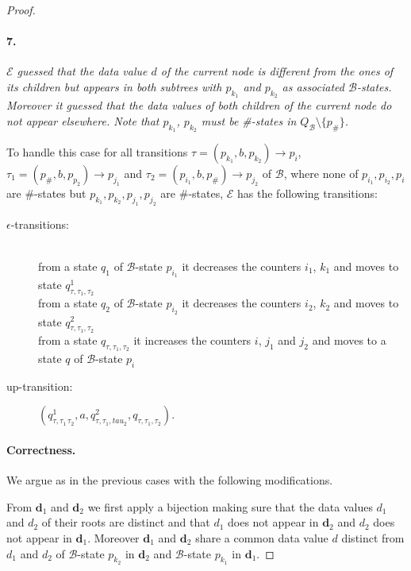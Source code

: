 \documentclass{CSML}
\newcommand\ra{\ensuremath{\rightarrow}}
\newcommand\Ba{\mathcal{B}}
\newcommand\Ea{\mathcal{E}}
\newcommand\dtree{\boldsymbol{d}}
\begin{document}
\begin{proof}
 
\paragraph{\bf 7.}  
\emph{$\Ea$ guessed that the data value $d$ of the
  current node is different from the ones of its children but appears in both
  subtrees with $p_{k_1}$ and $p_{k_2}$ as associated $\Ba$-states. 
  Moreover it guessed that the data values of both children of the current node do not appear elsewhere.
  Note that $p_{k_1}$, $p_{k_2}$ must be \#-states in $Q_\Ba \setminus \{ p_\#\}$.}

\noindent
To handle this case for all transitions 
$\tau = (p_{k_1},b,p_{k_2}) \ra p_{i}$,
$\tau_1 = (p_{\#},b,p_{p_2})\ra p_{j_1}$ and 
$\tau_2 = (p_{i_1},b,p_{\#})\ra p_{j_2}$ of $\Ba$, 
where none of $p_{i_1},p_{i_2}, p_i$ are $\#$-states but
$p_{k_1},p_{k_2},p_{j_1},p_{j_2}$ are $\#$-states, $\Ea$ has the following
transitions:
\begin{description}
\item[\rm $\epsilon$-transitions:]\quad\\
from a state $q_1$ of $\Ba$-state $p_{i_1}$
it decreases the counters $i_1$, $k_1$ 
and moves to state $q_{\tau,\tau_1,\tau_2}^1$\\
from a state $q_2$ of $\Ba$-state $p_{i_2}$ 
it decreases the counters $i_2$, $k_2$ 
and moves to state $q_{\tau,\tau_1,\tau_2}^2$\\ 
from a state $q_{\tau,\tau_1,\tau_2}$ 
it increases the counters $i$, $j_1$ and $j_2$ 
and moves to a state $q$ of $\Ba$-state $p_i$

\item[\rm up-transition:]
$(q_{\tau,\tau_1\,\tau_2}^1,a,q_{\tau,\tau_1,tau_2}^2,q_{\tau,\tau_1,\tau_2})$.
\end{description}

\paragraph{\bf Correctness.}  
We argue as in the previous cases with the following modifications.

From $\dtree_1$ and $\dtree_2$ we first apply a bijection making sure that the
data values $d_1$ and $d_2$ of their roots are distinct and that $d_1$ does not
appear in $\dtree_2$ and $d_2$ does not appear in
$\dtree_1$. Moreover $\dtree_1$ and $\dtree_2$ share a common data value $d$
distinct from $d_1$ and $d_2$ of $\Ba$-state $p_{k_2}$ in $\dtree_2$ and
$\Ba$-state $p_{k_1}$ in $\dtree_1$.


\end{proof}
\end{document}
